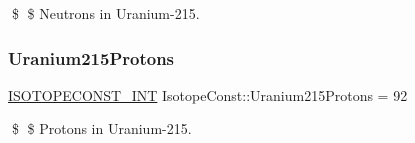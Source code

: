 \$ \$ Neutrons in Uranium-\/215. \mbox{\label{group___isotope_const-_uranium-_u215_gacc03f77995af6a4942425704db523d6a}} 
\subsubsection{\texorpdfstring{Uranium215\+Protons}{Uranium215Protons}}
{\footnotesize\ttfamily \mbox{\hyperlink{group___isotope_const-_macros_ga5f18360b3e99483a35c32d789e62621c}{I\+S\+O\+T\+O\+P\+E\+C\+O\+N\+S\+T\+\_\+\+I\+NT}} Isotope\+Const\+::\+Uranium215\+Protons = 92}

\$ \$ Protons in Uranium-\/215. 